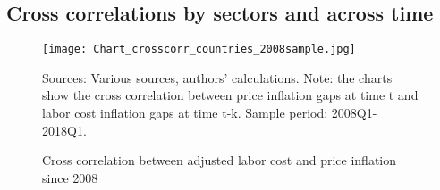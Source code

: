 \documentclass[11pt]{article}
\begin{document}
\begin{appendices}


\section{Cross correlations by sectors and across time} \label{AppendixCrossCorr}



\begin{figure}[!htbp]
\begin{center}
\caption{Cross correlation between adjusted labor cost and price inflation since 2008}\label{fig:CrossCorrCountries2008}
\texttt{[image: Chart\_crosscorr\_countries\_2008sample.jpg]}
\begin{minipage}{\textwidth} {\footnotesize
Sources: Various sources, authors' calculations.
Note: the charts show the cross correlation between price inflation gaps at time t and labor cost inflation gaps at time t-k.
Sample period: 2008Q1-2018Q1.\par}
\end{minipage}
\end{center}
\end{figure}


\end{appendices}
\end{document}

